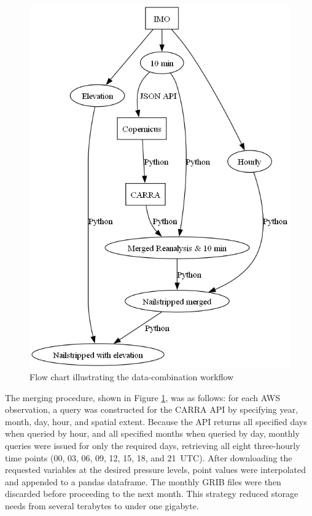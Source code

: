\begin{figure}[h]
  \centering
  \includegraphics[scale=0.5]{Figures/data-preprocessing-flow-chart.png}
  \caption{Flow chart illustrating the data-combination workflow}
  \label{fig:data_preprocessing_flow_chart}
\end{figure}

The merging procedure, shown in Figure \ref{fig:data_preprocessing_flow_chart}, was as follows: for each AWS observation, a query was constructed for the CARRA API by specifying year, month, day, hour, and spatial extent. Because the API returns all specified days when queried by hour, and all specified months when queried by day, monthly queries were issued for only the required days, retrieving all eight three-hourly time points (00, 03, 06, 09, 12, 15, 18, and 21~UTC). After downloading the requested variables at the desired pressure levels, point values were interpolated and appended to a pandas dataframe. The monthly GRIB files were then discarded before proceeding to the next month. This strategy reduced storage needs from several terabytes to under one gigabyte.

